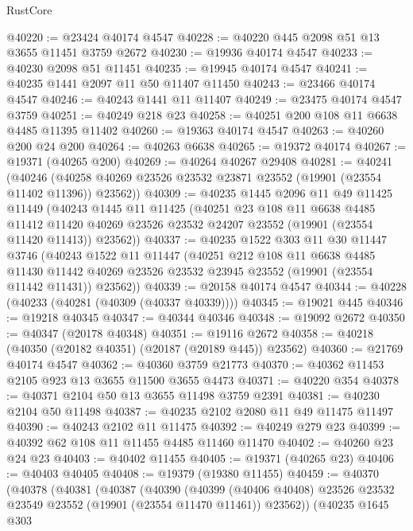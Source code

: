 \begin{lexlean}{RustCore}
\begin{coremodule}
@40220 := @23424 @40174 @4547
@40228 := @40220 @445 @2098 @51 @13 @3655 @11451 @3759 @2672
@40230 := @19936 @40174 @4547
@40233 := @40230 @2098 @51 @11451
@40235 := @19945 @40174 @4547
@40241 := @40235 @1441 @2097 @11 @50 @11407 @11450
@40243 := @23466 @40174 @4547
@40246 := @40243 @1441 @11 @11407
@40249 := @23475 @40174 @4547 @3759
@40251 := @40249 @218 @23
@40258 := @40251 @200 @108 @11 @6638 @4485 @11395 @11402
@40260 := @19363 @40174 @4547
@40263 := @40260 @200 @24 @200
@40264 := @40263 @6638
@40265 := @19372 @40174
@40267 := @19371 (@40265 @200)
@40269 := @40264 @40267 @29408
@40281 := @40241
    (@40246 (@40258 @40269 @23526 @23532 @23871 @23552 (@19901 (@23554 @11402 @11396)) @23562))
@40309 := @40235
    @1445
    @2096
    @11
    @49
    @11425
    @11449
    (@40243
      @1445
      @11
      @11425
      (@40251
        @23
        @108
        @11
        @6638
        @4485
        @11412
        @11420
        @40269
        @23526
        @23532
        @24207
        @23552
        (@19901 (@23554 @11420 @11413))
        @23562))
@40337 := @40235
    @1522
    @303
    @11
    @30
    @11447
    @3746
    (@40243
      @1522
      @11
      @11447
      (@40251
        @212
        @108
        @11
        @6638
        @4485
        @11430
        @11442
        @40269
        @23526
        @23532
        @23945
        @23552
        (@19901 (@23554 @11442 @11431))
        @23562))
@40339 := @20158 @40174 @4547
@40344 := @40228 (@40233 (@40281 (@40309 (@40337 @40339))))
@40345 := @19021 @445
@40346 := @19218 @40345
@40347 := @40344 @40346
@40348 := @19092 @2672
@40350 := @40347 (@20178 @40348)
@40351 := @19116 @2672
@40358 := @40218 (@40350 (@20182 @40351) (@20187 (@20189 @445)) @23562)
@40360 := @21769 @40174 @4547
@40362 := @40360 @3759 @21773
@40370 := @40362 @11453 @2105 @923 @13 @3655 @11500 @3655 @4473
@40371 := @40220 @354
@40378 := @40371 @2104 @50 @13 @3655 @11498 @3759 @2391
@40381 := @40230 @2104 @50 @11498
@40387 := @40235 @2102 @2080 @11 @49 @11475 @11497
@40390 := @40243 @2102 @11 @11475
@40392 := @40249 @279 @23
@40399 := @40392 @62 @108 @11 @11455 @4485 @11460 @11470
@40402 := @40260 @23 @24 @23
@40403 := @40402 @11455
@40405 := @19371 (@40265 @23)
@40406 := @40403 @40405
@40408 := @19379 (@19380 @11455)
@40459 := @40370
    (@40378
      (@40381
        (@40387
          (@40390
            (@40399
              (@40406 @40408)
              @23526
              @23532
              @23549
              @23552
              (@19901 (@23554 @11470 @11461))
              @23562))
          (@40235
            @1645
            @303

\end{coremodule}
\end{lexlean}
